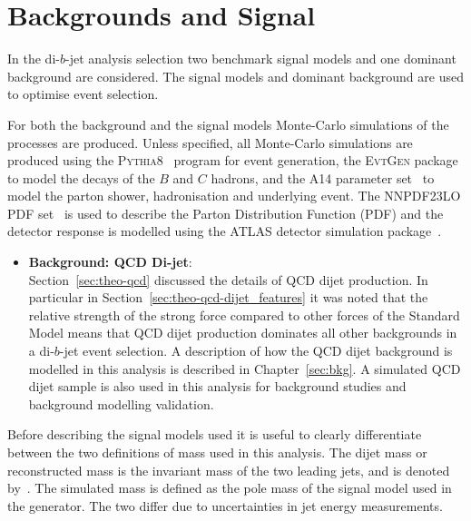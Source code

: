 \section{Backgrounds and Signal}
\label{sec:evt-s+b}

In the di-$b$-jet analysis selection two
benchmark signal models and one dominant background are considered.
The signal models and dominant background are
used to optimise event selection.

For both the background and the signal models Monte-Carlo simulations of the processes are produced.
Unless specified, all Monte-Carlo simulations are produced using
the \textsc{Pythia8}~\cite{dibjet-pythia8} program for event generation,
the \textsc{EvtGen} package~\cite{trig-evtGen} to model the decays of the $B$ and $C$ hadrons,
and the A14 parameter set~\cite{dibjet-a14} to model the parton shower, hadronisation and underlying event.
The NNPDF23LO PDF set~\cite{dibjet-nnpdf} is used to describe the Parton Distribution Function (PDF) and
the detector response is modelled using the ATLAS detector simulation package~\cite{dijet-sim_ATLAS}.

\begin{itemize}[leftmargin=*]
\item\textbf{Background: QCD Di-jet}:  \vspace{1em} \\
  Section~\ref{sec:theo-qcd} discussed the details of QCD dijet production.
  In particular in Section~\ref{sec:theo-qcd-dijet_features} it was noted that the
  relative strength of the strong force compared to other forces
  of the Standard Model means that QCD dijet production dominates all other backgrounds in a di-$b$-jet event selection.
  A description of how the QCD dijet background is modelled in this analysis is described in Chapter~\ref{sec:bkg}.
  A simulated QCD dijet sample is also used in this analysis
  for background studies and background modelling validation.
  \end{itemize}

\noindent
Before describing the signal models used it is useful to clearly differentiate between the two definitions of mass used in this analysis.
The dijet mass or reconstructed mass is the invariant mass of the two leading jets, and is denoted by~\mjj.
The simulated mass is defined as the pole mass of the signal model used in the generator.
The two differ due to uncertainties in jet energy measurements.


